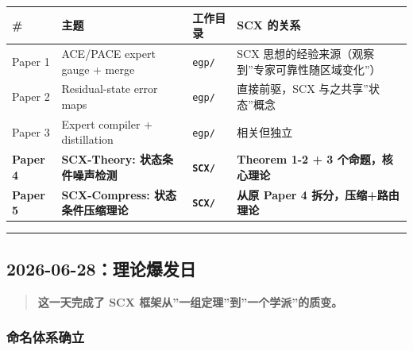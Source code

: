 \documentclass[
  12pt,
]{ctexart}
\begin{document}
\begin{longtable}[]{@{}
  >{\raggedright\arraybackslash}p{}
  >{\raggedright\arraybackslash}p{}
  >{\raggedright\arraybackslash}p{}
  >{\raggedright\arraybackslash}p{}@{}}
\toprule\noalign{}
\begin{minipage}[b]{\linewidth}\raggedright
\#
\end{minipage} & \begin{minipage}[b]{\linewidth}\raggedright
主题
\end{minipage} & \begin{minipage}[b]{\linewidth}\raggedright
工作目录
\end{minipage} & \begin{minipage}[b]{\linewidth}\raggedright
SCX 的关系
\end{minipage} \\
\midrule\noalign{}
\endhead
\bottomrule\noalign{}
\endlastfoot
Paper 1 & ACE/PACE expert gauge + merge & \texttt{egp/} & SCX
思想的经验来源（观察到''专家可靠性随区域变化''） \\
Paper 2 & Residual-state error maps & \texttt{egp/} & 直接前驱，SCX
与之共享''状态''概念 \\
Paper 3 & Expert compiler + distillation & \texttt{egp/} & 相关但独立 \\
\textbf{Paper 4} & \textbf{SCX-Theory: 状态条件噪声检测} &
\textbf{\texttt{SCX/}} & \textbf{Theorem 1-2 + 3 个命题，核心理论} \\
\textbf{Paper 5} & \textbf{SCX-Compress: 状态条件压缩理论} &
\textbf{\texttt{SCX/}} & \textbf{从原 Paper 4 拆分，压缩+路由理论} \\
\end{longtable}

\begin{center}\rule{0.5\linewidth}{0.5pt}\end{center}

\subsection{2026-06-28：理论爆发日}\label{ux7406ux8bbaux7206ux53d1ux65e5}

\begin{quote}
\textbf{这一天完成了 SCX 框架从''一组定理''到''一个学派''的质变。}
\end{quote}

\subsubsection{命名体系确立}\label{ux547dux540dux4f53ux7cfbux786eux7acb}
\end{document}
